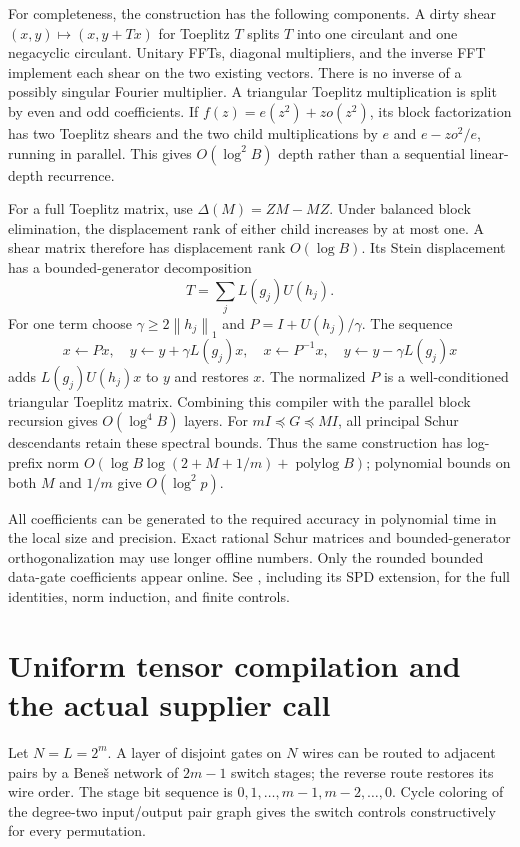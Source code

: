 \documentclass[11pt]{article}
\newcommand{\norm}[1]{\left\lVert #1\right\rVert}
\newcommand{\plog}{\operatorname{polylog}}
\newcommand{\file}[1]{\href{#1}{\texttt{\detokenize{#1}}}}
\begin{document}
For completeness, the construction has the following components. A dirty shear $(x,y)\mapsto(x,y+Tx)$ for Toeplitz $T$ splits $T$ into one circulant and one negacyclic circulant. Unitary FFTs, diagonal multipliers, and the inverse FFT implement each shear on the two existing vectors. There is no inverse of a possibly singular Fourier multiplier. A triangular Toeplitz multiplication is split by even and odd coefficients. If $f(z)=e(z^2)+zo(z^2)$, its block factorization has two Toeplitz shears and the two child multiplications by $e$ and $e-zo^2/e$, running in parallel. This gives $O(\log^2 B)$ depth rather than a sequential linear-depth recurrence.

For a full Toeplitz matrix, use $\Delta(M)=ZM-MZ$. Under balanced block elimination, the displacement rank of either child increases by at most one. A shear matrix therefore has displacement rank $O(\log B)$. Its Stein displacement has a bounded-generator decomposition
\[
 T=\sum_j L(g_j)U(h_j).
\]
For one term choose $\gamma\geq2\norm{h_j}_1$ and $P=I+U(h_j)/\gamma$. The sequence
\[
 x\leftarrow Px,\quad
 y\leftarrow y+\gamma L(g_j)x,\quad
 x\leftarrow P^{-1}x,\quad
 y\leftarrow y-\gamma L(g_j)x
\]
adds $L(g_j)U(h_j)x$ to $y$ and restores $x$. The normalized $P$ is a well-conditioned triangular Toeplitz matrix. Combining this compiler with the parallel block recursion gives $O(\log^4B)$ layers. For $mI\preceq G\preceq MI$, all principal Schur descendants retain these spectral bounds. Thus the same construction has log-prefix norm $O(\log B\log(2+M+1/m)+\plog B)$; polynomial bounds on both $M$ and $1/m$ give $O(\log^2p)$.

All coefficients can be generated to the required accuracy in polynomial time in the local size and precision. Exact rational Schur matrices and bounded-generator orthogonalization may use longer offline numbers. Only the rounded bounded data-gate coefficients appear online. See \file{SHALLOW-TOEPLITZ.md}, including its SPD extension, for the full identities, norm induction, and finite controls.

\section{Uniform tensor compilation and the actual supplier call}

Let $N=L=2^m$. A layer of disjoint gates on $N$ wires can be routed to adjacent pairs by a Bene\v{s} network of $2m-1$ switch stages; the reverse route restores its wire order. The stage bit sequence is $0,1,\ldots,m-1,m-2,\ldots,0$. Cycle coloring of the degree-two input/output pair graph gives the switch controls constructively for every permutation.
\end{document}
